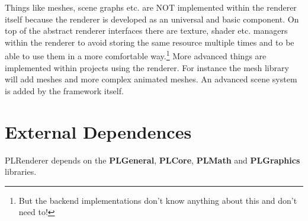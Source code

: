 Things like meshes, scene graphs etc. are NOT implemented within the renderer itself because the renderer is developed as an universal and basic component. On top of the abstract renderer interfaces there are texture, shader etc. managers within the renderer to avoid storing the same resource multiple times and to be able to use them in a more comfortable way.\footnote{But the backend implementations don't know anything about this and don't need to!} More advanced things are implemented within projects using the renderer. For instance the mesh library will add meshes and more complex animated meshes. An advanced scene system is added by the framework itself.




\section{External Dependences}
PLRenderer depends on the \textbf{PLGeneral}, \textbf{PLCore}, \textbf{PLMath} and \textbf{PLGraphics} libraries.
